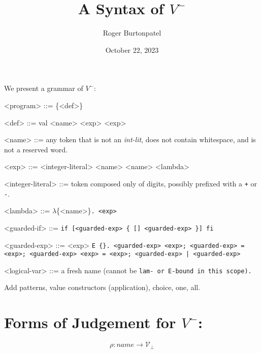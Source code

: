 \documentclass[]{article}
\title{A Syntax of $V^{-}$}
\author{Roger Burtonpatel}
\date{October 22, 2023}
\begin{document}
\maketitle

We present a grammar of $V^{-}$: 

\bigskip


\begin{grammar}
    <program> ::= \{<def>\}
    
    <def> ::= val <name> <exp>
        \alt <exp>
    
    <name> ::= any token that is not an \textit{int-lit}, does not contain 
    whitespace, 
    and is not a reserved word.

    <exp> ::= <integer-literal>
        \alt <name>
        \alt <name>
        \alt <lambda>

    <integer-literal> ::= token composed only of digits, possibly prefixed with a \texttt{+} or \texttt{-}.

    <lambda> ::= $\lambda$\{<name>\}\tt{.} <exp>

    <guarded-if> ::= \tt{if}  [<guarded-exp> \{ [] <guarded-exp> \}] \tt{fi}


    <guarded-exp> ::= <exp>
    \alt  \tt{E} \{<logical-var>\}\tt{.} <guarded-exp>
    \alt  <exp>\tt{;} <guarded-exp>
     \tt{=} <exp>\tt{;} <guarded-exp>
    \alt   <exp> \tt{=} <exp>\tt{;} <guarded-exp>
     | <guarded-exp>

    <logical-var> ::= a fresh name (cannot be \tt{lam}- or \tt{E}-bound in
    this scope).

\end{grammar}

Add patterns, value constructors (application), choice, one, all. 




    
    
    \section{Forms of Judgement for $V^{-}$:}
    
    $$\rho: name \rightarrow \mathcal{V}_{\bot}$$
    
\end{document}
